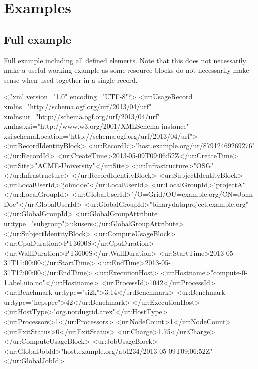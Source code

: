 
\section{Examples}

\subsection{Full example}

Full example including all defined elements. Note that this does not necessarily make a useful working example as some resource blocks do not necessarily make sense when used together in a single record.

\begin{XMLexample}
<?xml version="1.0" encoding="UTF-8"?>
<ur:UsageRecord xmlns="http://schema.ogf.org/urf/2013/04/urf"
    xmlns:ur="http://schema.ogf.org/urf/2013/04/urf"
    xmlns:xsi="http://www.w3.org/2001/XMLSchema-instance"
    xsi:schemaLocation="http://schema.ogf.org/urf/2013/04/urf">
    <ur:RecordIdentityBlock>
        <ur:RecordId>"host.example.org/ur/87912469269276"</ur:RecordId>
        <ur:CreateTime>2013-05-09T09:06:52Z</ur:CreateTime>
        <ur:Site>"ACME-University"</ur:Site>
        <ur:Infrastructure>"OSG"</ur:Infrastructure>
    </ur:RecordIdentityBlock>
    <ur:SubjectIdentityBlock>
        <ur:LocalUserId>"johndoe"</ur:LocalUserId>
        <ur:LocalGroupId>"projectA"</ur:LocalGroupId>
        <ur:GlobalUserId>"/O=Grid/OU=example.org/CN=John Doe"</ur:GlobalUserId>
        <ur:GlobalGroupId>"binarydataproject.example.org"</ur:GlobalGroupId>
        <ur:GlobalGroupAttribute ur:type="subgroup">ukusers</ur:GlobalGroupAttribute>
    </ur:SubjectIdentityBlock>
    <ur:ComputeUsageBlock>
        <ur:CpuDuration>PT3600S</ur:CpuDuration>
        <ur:WallDuration>PT3600S</ur:WallDuration>
        <ur:StartTime>2013-05-31T11:00:00</ur:StartTime>
        <ur:EndTime>2013-05-31T12:00:00</ur:EndTime>
        <ur:ExecutionHost>
            <ur:Hostname>"compute-0-1.abel.uio.no"</ur:Hostname>
            <ur:ProcessId>1042</ur:ProcessId>
            <ur:Benchmark ur:type="si2k">3.14</ur:Benchmark>
            <ur:Benchmark ur:type="hepspec">42</ur:Benchmark>
        </ur:ExecutionHost>
        <ur:HostType>"org.nordugrid.arex"</ur:HostType>
        <ur:Processors>1</ur:Processors>
        <ur:NodeCount>1</ur:NodeCount>
        <ur:ExitStatus>0</ur:ExitStatus>
        <ur:Charge>1.75</ur:Charge>
    </ur:ComputeUsageBlock>
    <ur:JobUsageBlock>
        <ur:GlobalJobId>"host.example.org/ab1234/2013-05-09T09:06:52Z"</ur:GlobalJobId>

\end{XMLexample}
